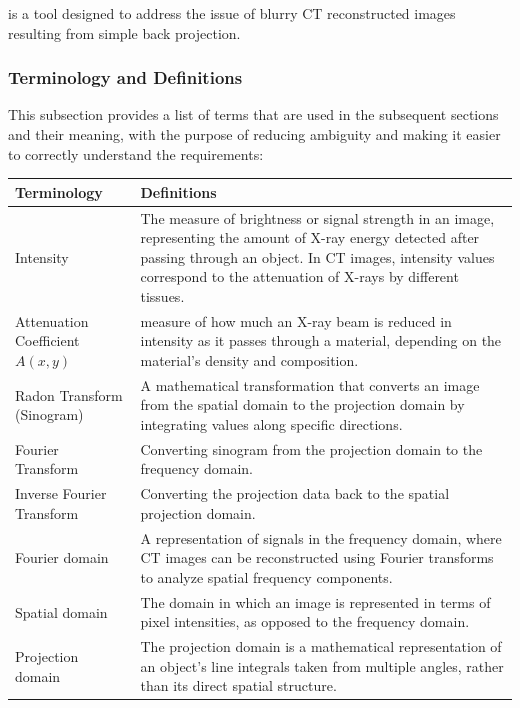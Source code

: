 \documentclass[12pt]{article}
\begin{document}
\progname{} is a tool designed to address the issue of blurry CT reconstructed
images resulting from simple back projection.

\subsubsection{Terminology and  Definitions} \label{term}
This subsection provides a list of terms that are used in the subsequent
sections and their meaning, with the purpose of reducing ambiguity and making it
easier to correctly understand the requirements:

\begin{tabular}{p{4cm} p{11cm}}
  \toprule
  \textbf{Terminology} & \textbf{Definitions}\\
  \midrule
  Intensity & The measure of brightness or signal strength in an image, representing the amount of X-ray energy detected after passing through an object. In CT images, intensity values correspond to the attenuation of X-rays by different tissues.\\

  Attenuation Coefficient $A(x,y)$&  measure of how much an X-ray beam is reduced in intensity as it passes through a material, depending on the material's density and composition.\\

  Radon Transform (Sinogram) & A mathematical transformation that converts an image from the spatial domain to the projection domain by integrating values along specific directions.\\

  Fourier Transform & Converting sinogram from the projection domain to the frequency domain.\\

  Inverse Fourier Transform & Converting the projection data back to the spatial projection domain.\\

  Fourier domain & A representation of signals in the frequency domain, where CT images can be reconstructed using Fourier transforms to analyze spatial frequency components.\\

  Spatial domain & The domain in which an image is represented in terms of pixel intensities, as opposed to the frequency domain.\\

  Projection domain & The projection domain is a mathematical representation of an object's line integrals taken from multiple angles, rather than its direct spatial structure.\\


\end{tabular}
\end{document}
